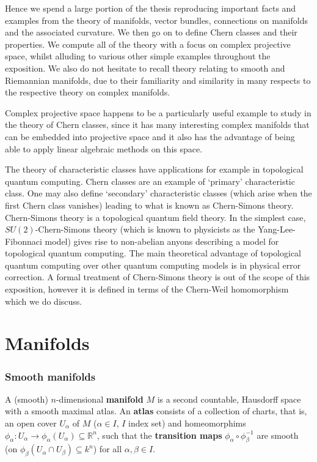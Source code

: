 \documentclass[a4paper]{article}
\theoremstyle{definition} \newtheorem*{definition}{Definition}
\theoremstyle{definition} \newtheorem*{definitions}{Definitions}
\theoremstyle{plain} \newtheorem{theorem}{Theorem}[section]
\theoremstyle{plain} \newtheorem{proposition}[theorem]{Proposition}
\theoremstyle{plain} \newtheorem{corollary}[theorem]{Corollary}
\theoremstyle{plain} \newtheorem{lemma}[theorem]{Lemma}
\theoremstyle{plain} \newtheorem{example}[theorem]{Example}
\newcommand{\defn}[1]{\textbf{#1}}
\newcommand{\realnos}{\mathbb{R}}
\begin{document}
Hence we spend a large portion of the thesis  reproducing important facts and examples from the theory of manifolds, vector bundles, connections on manifolds and the associated curvature. We then go on to define Chern classes and their properties. We compute all of the theory with a focus on complex projective space, whilst alluding to various other simple examples throughout the exposition. We also do not hesitate to recall theory relating to smooth and Riemannian manifolds, due to their familiarity and similarity in many respects to the respective theory on complex manifolds.

Complex projective space happens to be a particularly useful example to study in the theory of Chern classes, since it has many interesting complex manifolds that can be embedded into projective space and it also has the advantage of being able to apply linear algebraic methods on this space. 

The theory of characteristic classes have applications for example in topological quantum computing. Chern classes are an example of `primary' characteristic class. One may also define `secondary' characteristic classes (which arise when the first Chern class vanishes) leading to what is known as Chern-Simons theory. Chern-Simons theory is a topological quantum field theory. In the simplest case, $SU(2)$-Chern-Simons theory (which is known to physicists as the Yang-Lee-Fibonnaci model) gives rise to non-abelian anyons describing a model for topological quantum computing. The main theoretical advantage of topological quantum computing over other quantum computing models is in physical error correction. A formal treatment of Chern-Simons theory is out of the scope of this exposition, however it is defined in terms of the Chern-Weil homomorphism which we do discuss.

\section{Manifolds}

\subsubsection{Smooth manifolds}

A (smooth) $n$-dimensional \defn{manifold} $M$ is a second countable, Hausdorff space with a smooth maximal atlas. An \defn{atlas} consists of a collection of charts, that is, an open cover $U_\alpha$ of $M$ ($\alpha\in I$, $I$ index set)  and homeomorphims $\phi_\alpha:U_\alpha \to \phi_\alpha(U_\alpha) \subseteq \realnos^n$, such that the \defn{transition maps} $\phi_\alpha \circ \phi_\beta^{-1}$ are smooth (on $\phi_\beta(U_\alpha \cap U_\beta)\subseteq k^n$) for all $\alpha, \beta\in I$. 
\end{document}
